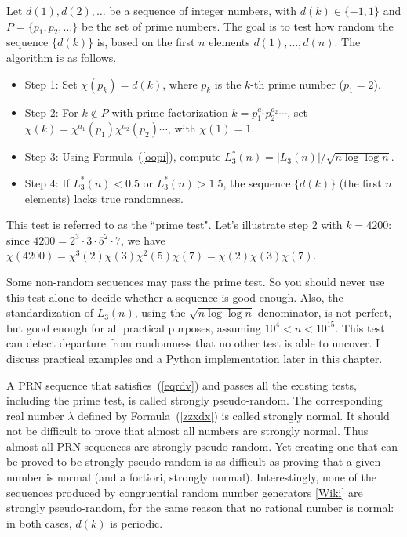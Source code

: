 \documentclass[oneside,10pt]{book}
\begin{document}
Let $d(1),d(2),\dots$ be a sequence of integer numbers, with $d(k)\in \{-1,1\}$ and
$P=\{p_1,p_2,\dots\}$ be the set of prime numbers. The goal is to test how random the sequence $\{d(k)\}$ is, based on the first $n$ elements $d(1),\dots,d(n)$. The algorithm is as follows.
\begin{itemize}
\item Step 1: Set $\chi(p_k)=d(k)$, where $p_k$ is the $k$-th prime number ($p_1=2$).
\item Step 2: For $k\notin P$ with
 prime factorization $k=p_1^{a_1}p_2^{a_2}\cdots$, set
$\chi(k)=\chi^{a_1}(p_1)\chi^{a_2}(p_2)\cdots$, with $\chi(1)=1.$
\item Step 3: Using Formula~(\ref{oopi}), compute $L^*_3(n) = |L_3(n)|/\sqrt{n\log\log n}$.
\item Step 4: If $L^*_3(n)<0.5$ or $L^*_3(n)>1.5$, the sequence $\{d(k)\}$ (the first $n$ elements) lacks true randomness.
\end{itemize}
This test is referred to as the ``\textcolor{index}{prime test}".
Let's illustrate step 2 with $k=4200$: since $4200=2^3\cdot 3\cdot 5^2 \cdot 7$, we have $\chi(4200)=\chi^3(2)\chi(3)\chi^2(5)\chi(7)
 = \chi(2)\chi(3)\chi(7)$.

Some non-random sequences may pass the prime test. So you should never use this test alone to decide whether a sequence is good enough.
 Also, the standardization of $L_3(n)$, using the $\sqrt{n\log\log n}$ denominator, is not perfect, but good enough for all practical purposes, assuming $10^4<n<10^{15}$.  This test can detect departure from randomness that no other test is able to uncover.
I discuss practical examples and
 a Python implementation later in this chapter.

A PRN sequence that satisfies~(\ref{eqrdv}) and passes all the existing tests, including the prime test, is called \textcolor{index}{strongly pseudo-random}. The
corresponding real number $\lambda$ defined by Formula~(\ref{zzxdx}) is called \textcolor{index}{strongly normal}. It should not be difficult to
prove that almost all numbers are strongly normal. Thus almost all PRN sequences are strongly pseudo-random. Yet creating
one that can be proved to be strongly pseudo-random is as difficult as proving that a given number is normal (and a fortiori, strongly normal). Interestingly, none of the sequences produced by \textcolor{index}{congruential random number generators}
[\href{https://en.wikipedia.org/wiki/Linear_congruential_generator}{Wiki}] are strongly pseudo-random,
for the same reason that no rational number is normal: in both cases, $d(k)$ is periodic.
\end{document}
